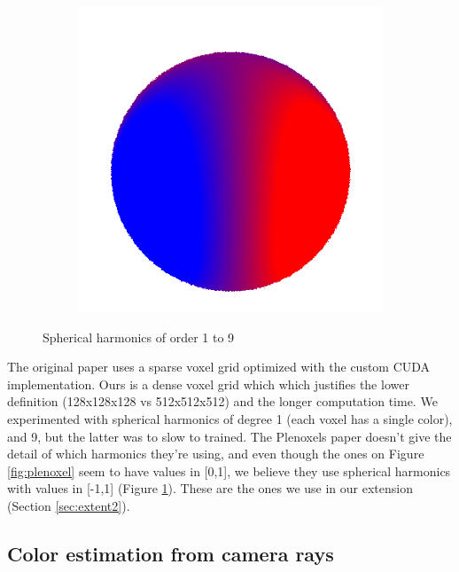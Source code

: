 \documentclass{article}
\begin{document}
\begin{figure}[!h]
\begin{subfigure}{.1\textwidth}
\end{subfigure}
\begin{subfigure}{.1\textwidth}
  \centering
  \includegraphics[width=\linewidth]{figs/spherical_harmonics/harmonics_8.png}  
\end{subfigure}
     \caption{Spherical harmonics of order 1 to 9}
    \label{fig:sph_harm}
\end{figure}


The original paper uses a sparse voxel grid optimized with the custom CUDA implementation. Ours is a dense voxel grid which which justifies the lower definition (128x128x128 vs 512x512x512) and the longer computation time. We experimented with spherical harmonics of degree 1 (each voxel has a single color), and 9, but the latter was to slow to trained. The Plenoxels paper doesn't give the detail of which harmonics they're using, and even though the ones on Figure \ref{fig:plenoxel} seem to have values in [0,1], we believe they use spherical harmonics with values in [-1,1] (Figure \ref{fig:sph_harm}). These are the ones we use in our extension (Section \ref{sec:extent2}).

\subsection{Color estimation from camera rays}
\end{document}
